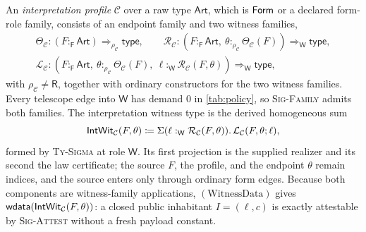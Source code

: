 \documentclass[11pt]{article}
\numberwithin{equation}{section}
\theoremstyle{definition}
\theoremstyle{plain}
\theoremstyle{remark}
\newcommand{\Type}{\mathsf{type}}
\renewcommand{\Form}{\AFForm}
\newcommand{\Frm}{\mathsf F}
\newcommand{\Wit}{\mathsf W}
\newcommand{\Ren}{\mathsf R}
\begin{document}
An \emph{interpretation profile} \(\mathcal C\) over a raw type
\(\mathsf{Art}\), which is \(\Form\) or a declared form-role family,
consists of an endpoint family and two witness families,
\[
\begin{gathered}
 \Theta_{\mathcal C}:(F:_{\Frm}\mathsf{Art})\Rightarrow_{\rho_{\mathcal C}}\Type,
 \qquad
 \mathcal R_{\mathcal C}:
  (F:_{\Frm}\mathsf{Art},\ \theta:_{\rho_{\mathcal C}}\Theta_{\mathcal C}(F))
  \Rightarrow_{\Wit}\Type,\\
 \mathcal L_{\mathcal C}:
  (F:_{\Frm}\mathsf{Art},\ \theta:_{\rho_{\mathcal C}}\Theta_{\mathcal C}(F),\
   \ell:_{\Wit}\mathcal R_{\mathcal C}(F,\theta))
  \Rightarrow_{\Wit}\Type,
\end{gathered}
\]
with \(\rho_{\mathcal C}\ne\Ren\), together with ordinary constructors for
the two witness families.  Every telescope edge into \(\Wit\) has demand
\(0\) in \cref{tab:policy}, so \textsc{Sig-Family} admits both families.
The interpretation witness type is the derived homogeneous sum
\[
 \AFIntWit_{\mathcal C}(F,\theta)
 \coloneqq
 \AFDepPair(\ell:_{\Wit}\mathcal R_{\mathcal C}(F,\theta)).\,
 \mathcal L_{\mathcal C}(F,\theta;\ell),
\]
formed by \textsc{Ty-Sigma} at role \(\Wit\).  Its first projection is the
supplied realizer and its second the law certificate; the source \(F\), the
profile, and the endpoint \(\theta\) remain indices, and the source enters
only through ordinary form edges.  Because both components are
witness-family applications, \((\mathrm{WitnessData})\) gives
\(\mathsf{wdata}({\mathsf{IntWit}}_{\mathcal C}(F,\theta))\): a closed public
inhabitant \(I=(\ell,c)\) is exactly attestable by \textsc{Sig-Attest}
without a fresh payload constant.
\end{document}
